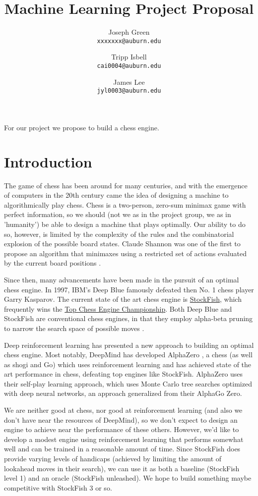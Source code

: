 \documentclass[notitlepage, 12pt]{article}
\title{Machine Learning Project Proposal}
\author{
  Joseph Green\\
  \texttt{xxxxxxx@auburn.edu}
  \and
  Tripp Isbell\\
  \texttt{cai0004@auburn.edu}
  \and
  James Lee\\
  \texttt{jyl0003@auburn.edu}
}
\date{}
\begin{document}
\maketitle
For our project we propose to build a chess engine.
\section*{Introduction}
The game of chess has been around for many centuries, and with the emergence of computers in the 20th century came the idea of designing a machine to algorithmically play chess. Chess is a two-person, zero-sum minimax game \cite{vonneumann} with perfect information, so we should (not we as in the project group, we as in 'humanity') be able to design a machine that plays optimally. Our ability to do so, however, is limited by the complexity of the rules and the combinatorial explosion of the possible board states. Claude Shannon was one of the first to propose an algorithm that minimaxes using a restricted set of actions evaluated by the current board positions \cite{shannon}. 

Since then, many advancements have been made in the pursuit of an optimal chess engine. In 1997, IBM's Deep Blue famously defeated then No. 1 chess player Garry Kasparov. The current state of the art chess engine is \href{https://stockfishchess.org/}{StockFish}, which frequently wins the \href{https://en.wikipedia.org/wiki/Top_Chess_Engine_Championship}{Top Chess Engine Championship}. Both Deep Blue and StockFish are conventional chess engines, in that they employ alpha-beta pruning to narrow the search space of possible moves \cite{alphabeta}. 

Deep reinforcement learning has presented a new approach to building an optimal chess engine. Most notably, DeepMind has developed AlphaZero \cite{alphazero}, a chess (as well as shogi and Go) which uses reinforcement learning and has achieved state of the art performance in chess, defeating top engines like StockFish. AlphaZero uses their self-play learning approach, which uses Monte Carlo tree searches optimized with deep neural networks, an approach generalized from their AlphaGo Zero\cite{alphagozero}.

We are neither good at chess, nor good at reinforcement learning (and also we don't have near the resources of DeepMind), so we don't expect to design an engine to achieve near the performance of these others. However, we'd like to develop a modest engine using reinforcement learning that performs somewhat well and can be trained in a reasonable amount of time. Since StockFish does provide varying levels of handicaps (achieved by limiting the amount of lookahead moves in their search), we can use it as both a baseline (StockFish level 1) and an oracle (StockFish unleashed). We hope to build something maybe competitive with StockFish 3 or so.
\end{document}
